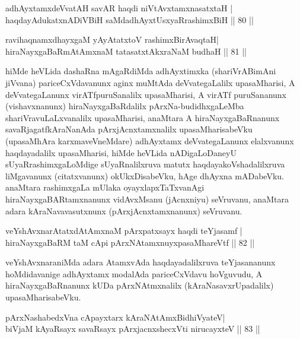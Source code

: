 \begin{shl}
adhAyxtamxdeVvatAH savAR haqdi niVtAvx\s \s tamxnasatxtaH |\\
haqdayAdukatxnADiVBiH saMdadhAyxtUsxyaRrashimxBiH \hfill || 80 || 
\end{shl}

\begin{shl}
ravihaqnamxdhayxgaM yAyAtatxtoV rashimxBirAvaqtaH|\\
hiraNayxgaBaRmAtAmxnaM tatasatxtAkxraNaM budhaH \hfill || 81 || 
\end{shl}

\begin{artha}
hiMde heVLida dashaRna mAgaRdiMda adhAyxtimxka (shariVrABimAni jiVvana) pariceCxVdavanunx aginx muMtAda deVvategaLalilx upasaMharisi, A deVvategaLanunx virATfpuruSanalilx upasaMharisi, A virATf puruSananunx (vishavxnanunx) hiraNayxgaBaRdalilx pArxNa-budidhxgaLeMba shariVravuLaLxvanalilx upasaMharisi, anaMtara A hiraNayxgaBaRnanunx savaRjagatfkAraNanAda pArxjAcnxtamxnalilx upasaMharisabeVku (upasaMhAra karxmaveVneMdare) adhAyxtamx deVvategaLanunx elalxvanunx haqdayadalilx upasaMharisi, hiMde heVLida nADigaLoDaneyU sUyaRrashimxgaLoMdige sUyaRnalilxruva matutx haqdayakoVshadalilxruva liMgavanunx (citatxvanunx) okUkxDisabeVku, hAge dhAyxna mADabeVku. anaMtara rashimxgaLa mUlaka oyayxlapxTaTxvanAgi hiraNayxgaBARtamxnanunx vidAvxMsanu (jAcnxniyu) seVruvanu, anaMtara adara kAraNavavasutxnunx (pArxjAcnxtamxnanunx) seVruvanu.
\end{artha}


\begin{shl}
veYshAvxnarAtatxdAtAmxnaM pArxpatxsayx haqdi teYjasamf |\\
hiraNayxgaBaRM taM cApi pArxNAtamxnuyxpasaMhareVtf \hfill || 82 || 
\end{shl}

\begin{artha}
veYshAvxnaraniMda adara AtamxvAda haqdayadalilxruva teYjasananunx hoMdidavanige adhAyxtamx modalAda pariceCxVdavu hoVguvudu, A hiraNayxgaBaRnanunx kUDa pArxNAtmxnalilx (kAraNasavxrUpadalilx) upa\-\break saMharisabeVku.
\end{artha}


\begin{shl}
pArxNashabedxVna cApayxtarx kAraNAtAmx\s BidhiVyateV|\\
biVjaM kAyaRsayx savaRsayx pArxjacnxshecxVti nirucayxteV \hfill || 83 || 
\end{shl}

